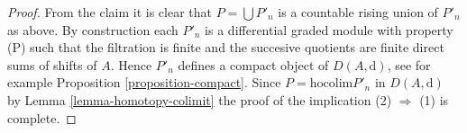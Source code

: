\begin{proof}
\medskip\noindent
From the claim it is clear that $P = \bigcup P'_n$
is a countable rising union of $P'_n$ as above.
By construction each $P'_n$ is a differential graded module with
property (P) such that the filtration is finite and the succesive
quotients are finite direct sums of shifts of $A$. Hence $P'_n$
defines a compact object of $D(A, \text{d})$, see for example
Proposition \ref{proposition-compact}. Since
$P = \text{hocolim} P'_n$ in $D(A, \text{d})$
by Lemma \ref{lemma-homotopy-colimit}
the proof of the implication (2) $\Rightarrow$ (1) is complete.
\end{proof}











